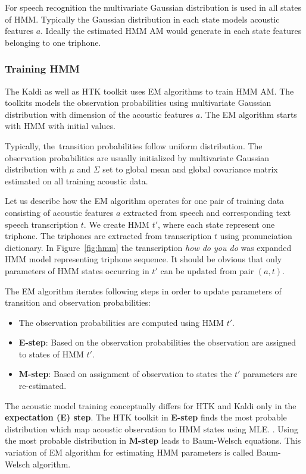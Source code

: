 {
For speech recognition the multivariate Gaussian distribution is used in all states of \ac{HMM}. 
Typically the Gaussian distribution in each state models acoustic features $a$.
Ideally the estimated \ac{HMM} \ac{AM} would generate in each state features belonging to one triphone.

\subsubsection*{Training \ac{HMM}}
\label{sub:trainhmm}

The Kaldi as well as \ac{HTK} toolkit uses \acl{EM} algorithms to train \ac{HMM} \acl{AM}.
The toolkits models the observation probabilities using multivariate Gaussian distribution 
with dimension of the acoustic features $a$.
The \ac{EM} algorithm starts with \ac{HMM} with initial values. 

Typically, the~transition probabilities follow uniform distribution.
The observation probabilities are usually initialized by multivariate Gaussian distribution
with $\mu$ and $\Sigma$ set to global mean and global covariance matrix 
estimated on all training acoustic data.

Let us describe how the \ac{EM} algorithm operates for one pair
of training data consisting of acoustic features $a$ extracted from speech
and corresponding text speech transcription $t$.
We create \ac{HMM} $t'$, where each state represent one triphone. 
The triphones are extracted from transcription $t$ using pronunciation dictionary.
In Figure~\ref{fig:hmm} the transcription {\it how do you do} was expanded \ac{HMM} model representing triphone sequence.
It should be obvious that only parameters of HMM states occurring in $t'$ can be updated from pair $(a, t)$.

The \ac{EM} algorithm iterates following steps in order to update parameters of transition and observation probabilities:
\begin{itemize}
    \item The observation probabilities are computed using \ac{HMM} $t'$. 
    \item {\bf E-step}: Based on the observation probabilities the observation are assigned to states of \ac{HMM} $t'$. 
    \item {\bf M-step}: Based on assignment of observation to states the $t'$ parameters are re-estimated. 
\end{itemize}

The acoustic model training conceptually differs for \ac{HTK} and Kaldi only in the {\bf expectation (E) step}.
The \ac{HTK} toolkit in {\bf E-step} finds the most probable distribution 
which map acoustic observation to \ac{HMM} states using \ac{MLE}. . 
Using the most probable distribution in {\bf M-step} leads to Baum-Welsch equations. \cite{huang2001spoken}
This variation of \ac{EM} algorithm for estimating \ac{HMM} parameters is called Baum-Welsch algorithm.

}
